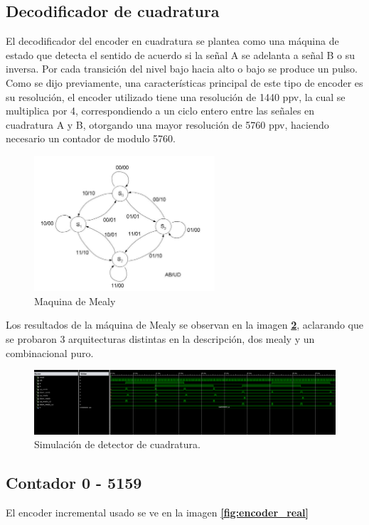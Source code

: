 \documentclass[11pt, a4paper]{article}
\begin{document}
		
		\subsection{Decodificador de cuadratura}
			El decodificador del encoder en cuadratura se plantea como una máquina de estado que detecta el sentido de acuerdo si la señal A se adelanta a señal B o su inversa. Por cada transición del nivel bajo hacia alto o bajo se produce un pulso. Como se dijo previamente, una características principal de este tipo de encoder es su resolución, el encoder utilizado tiene una resolución de 1440 ppv, la cual se multiplica por 4, correspondiendo a un ciclo entero entre las señales en cuadratura A y B, otorgando una mayor resolución de 5760 ppv, haciendo necesario un contador de modulo 5760.	
		\begin{figure}[H]
			\centering
			\includegraphics[width=0.6\textwidth]{Imagenes/mealy.jpg}
			\caption{Maquina de Mealy}
			\label{fig:mealy}
		\end{figure} 
		
		Los resultados de la máquina de Mealy se observan en la imagen \textcolor{blue}{\textbf{\ref{fig:mealy_tb}}}, aclarando que se probaron 3 arquitecturas distintas en la descripción, dos mealy y un combinacional puro.

		\begin{figure}[H]
			\centering
			\includegraphics[width=\textwidth]{Imagenes/tb_mealy.png}
			\caption{Simulación de detector de cuadratura.}
			\label{fig:mealy_tb}
		\end{figure} 

		\subsection{Contador 0 - 5159}
			El encoder incremental usado se ve en la imagen \textcolor{blue}{\textbf{\ref{fig:encoder_real}}} 
\end{document}

